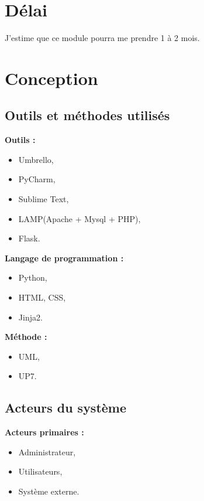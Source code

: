 \documentclass[12pt,a4paper]{article}
\begin{document}
\section{Délai}
	J'estime que ce module pourra me prendre 1 à 2 mois.
	
	
	
	\newpage
\section{Conception}
	\subsection{Outils et méthodes utilisés}
		\textbf{Outils :}
		
			\begin{itemize}
				\item Umbrello,
				\item PyCharm,
				\item Sublime Text,
				\item LAMP(Apache + Mysql + PHP),
				\item Flask.\\
			\end{itemize}
			
		\textbf{Langage de programmation :}\\
		
			\begin{itemize}
				\item Python,
				\item HTML, CSS,
				\item Jinja2.\\
			\end{itemize}
			
		\textbf{Méthode :}\\
		
			\begin{itemize}
				\item UML,
				\item UP7.
			\end{itemize}
			
		\subsection{ Acteurs du système}
		
			\textbf{Acteurs primaires :}\\
			
				\begin{itemize}
					\item Administrateur,
					\item Utilisateurs,
					\item Système externe.\\
				\end{itemize}					
		\newpage
\end{document}

